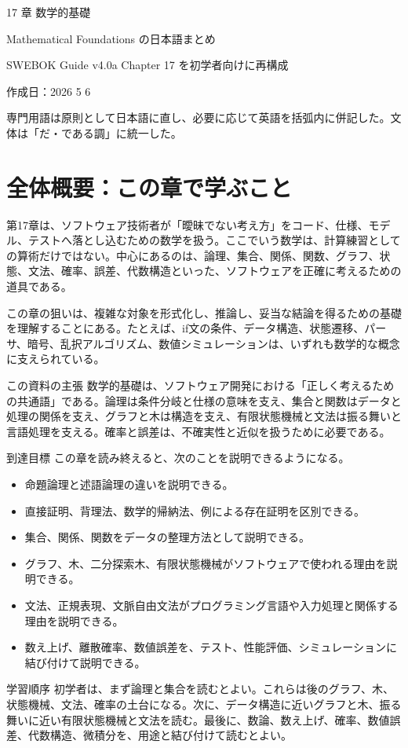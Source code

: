\documentclass[uplatex,dvipdfmx,a4paper,10pt]{jsarticle}
\begin{document}
\begin{titlepage}
\centering
{\Large 17 章 数学的基礎\par}
\vspace{0.8em}
{\large Mathematical Foundations の日本語まとめ\par}
\vspace{0.8em}
{SWEBOK Guide v4.0a Chapter 17 を初学者向けに再構成\par}
\vspace{2em}
{作成日：2026 5 6\par}
\vfill
{専門用語は原則として日本語に直し、必要に応じて英語を括弧内に併記した。文体は「だ・である調」に統一した。\par}
\end{titlepage}
\tableofcontents
\newpage
\section{全体概要：この章で学ぶこと}
第17章は、ソフトウェア技術者が「曖昧でない考え方」をコード、仕様、モデル、テストへ落とし込むための数学を扱う。ここでいう数学は、計算練習としての算術だけではない。中心にあるのは、論理、集合、関係、関数、グラフ、状態、文法、確率、誤差、代数構造といった、ソフトウェアを正確に考えるための道具である。

この章の狙いは、複雑な対象を形式化し、推論し、妥当な結論を得るための基礎を理解することにある。たとえば、if文の条件、データ構造、状態遷移、パーサ、暗号、乱択アルゴリズム、数値シミュレーションは、いずれも数学的な概念に支えられている。

\begin{infobox}{この資料の主張}
数学的基礎は、ソフトウェア開発における「正しく考えるための共通語」である。論理は条件分岐と仕様の意味を支え、集合と関数はデータと処理の関係を支え、グラフと木は構造を支え、有限状態機械と文法は振る舞いと言語処理を支える。確率と誤差は、不確実性と近似を扱うために必要である。
\end{infobox}
到達目標 この章を読み終えると、次のことを説明できるようになる。

\begin{itemize}[leftmargin=2zw]
\item 命題論理と述語論理の違いを説明できる。
\item 直接証明、背理法、数学的帰納法、例による存在証明を区別できる。
\item 集合、関係、関数をデータの整理方法として説明できる。
\item グラフ、木、二分探索木、有限状態機械がソフトウェアで使われる理由を説明できる。
\item 文法、正規表現、文脈自由文法がプログラミング言語や入力処理と関係する理由を説明できる。
\item 数え上げ、離散確率、数値誤差を、テスト、性能評価、シミュレーションに結び付けて説明できる。
\end{itemize}
学習順序 初学者は、まず論理と集合を読むとよい。これらは後のグラフ、木、状態機械、文法、確率の土台になる。次に、データ構造に近いグラフと木、振る舞いに近い有限状態機械と文法を読む。最後に、数論、数え上げ、確率、数値誤差、代数構造、微積分を、用途と結び付けて読むとよい。
\end{document}
